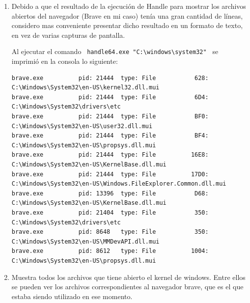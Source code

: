 \documentclass[12pt]{article}
\begin{document}
\begin{enumerate}[1.]
      \item Debido a que el resultado de la ejecución de Handle para mostrar los archivos abiertos del navegador (Brave en mi caso) tenía una gran cantidad de líneas, considero mas conveniente presentar dicho resultado en un formato de texto, en vez de varias capturas de pantalla. 

	Al ejecutar el comando \verb| handle64.exe "C:\windows\system32" | se imprimió en la consola lo siguiente:
     \begin{lstlisting}[style=consola]
brave.exe          pid: 21444  type: File           628: C:\Windows\System32\en-US\kernel32.dll.mui
brave.exe          pid: 21444  type: File           6D4: C:\Windows\System32\drivers\etc
brave.exe          pid: 21444  type: File           BF0: C:\Windows\System32\en-US\user32.dll.mui
brave.exe          pid: 21444  type: File           BF4: C:\Windows\System32\en-US\propsys.dll.mui
brave.exe          pid: 21444  type: File          16E8: C:\Windows\System32\en-US\KernelBase.dll.mui
brave.exe          pid: 21444  type: File          17D0: C:\Windows\System32\en-US\Windows.FileExplorer.Common.dll.mui
brave.exe          pid: 13396  type: File           D68: C:\Windows\System32\en-US\KernelBase.dll.mui
brave.exe          pid: 21404  type: File           350: C:\Windows\System32\drivers\etc
brave.exe          pid: 8648   type: File           350: C:\Windows\System32\en-US\MMDevAPI.dll.mui
brave.exe          pid: 8612   type: File          1004: C:\Windows\System32\en-US\propsys.dll.mui
     \end{lstlisting} 

      \item Muestra todos los archivos que tiene abierto el kernel de windows. Entre ellos se pueden ver los archivos correspondientes al navegador brave, que es el que estaba siendo utilizado en ese momento.


\end{enumerate}
\end{document}
